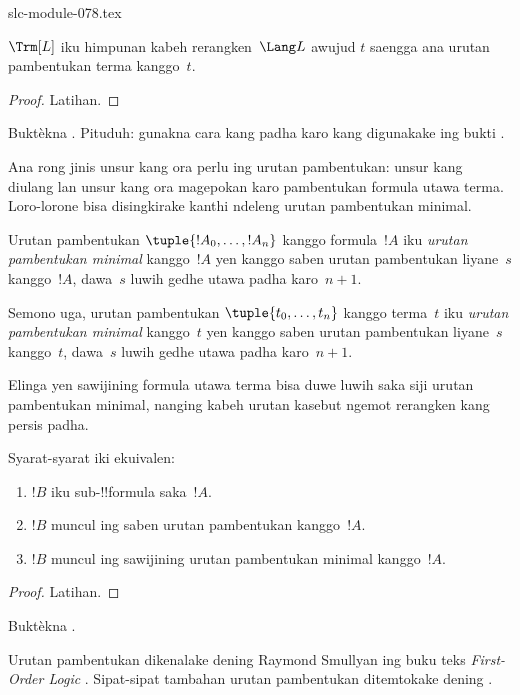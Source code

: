 \begin{filecontents*}[overwrite]{slc-module-078.tex}
\begin{prop}
$\Trm[L]$ iku himpunan kabeh rerangken~$\Lang L$ awujud $t$
saengga ana urutan pambentukan terma kanggo~$t$.
\end{prop}

\begin{proof}
Latihan.
\end{proof}

\begin{prob}
Buktèkna .
Pituduh: gunakna cara kang padha karo kang digunakake ing bukti
.
\end{prob}

Ana rong jinis unsur kang ora perlu ing urutan pambentukan:
unsur kang diulang lan unsur kang ora magepokan karo pambentukan
formula utawa terma. Loro-lorone bisa disingkirake kanthi ndeleng
urutan pambentukan minimal.

\begin{defn}
Urutan pambentukan $\tuple{!A_0, \ldots, !A_n}$ kanggo
formula~$!A$ iku \emph{urutan pambentukan minimal} kanggo~$!A$
yen kanggo saben urutan pambentukan liyane~$s$ kanggo~$!A$,
dawa~$s$ luwih gedhe utawa padha karo~$n+1$.

Semono uga, urutan pambentukan $\tuple{t_0, \ldots, t_n}$
kanggo terma~$t$ iku \emph{urutan pambentukan minimal}
kanggo~$t$ yen kanggo saben urutan pambentukan liyane~$s$ kanggo~$t$,
dawa~$s$ luwih gedhe utawa padha karo~$n+1$.
\end{defn}

Elinga yen sawijining formula utawa terma bisa duwe luwih saka
siji urutan pambentukan minimal, nanging kabeh urutan kasebut
ngemot rerangken kang persis padha.

\begin{prop}
Syarat-syarat iki ekuivalen:
\begin{enumerate}
    \item $!B$ iku sub-!!{formula} saka~$!A$.
    \item $!B$ muncul ing saben urutan pambentukan kanggo~$!A$.
    \item $!B$ muncul ing sawijining urutan pambentukan minimal
      kanggo~$!A$.
\end{enumerate}
\end{prop}

\begin{proof}
Latihan.
\end{proof}

\begin{prob}
Buktèkna .
\end{prob}

\begin{history}
Urutan pambentukan dikenalake dening Raymond Smullyan ing
buku teks \emph{First-Order Logic} \citep{Smullyan1968}.
Sipat-sipat tambahan urutan pambentukan ditemtokake dening
\citet{Zuckerman1973}.
\end{history}


\end{filecontents*}

